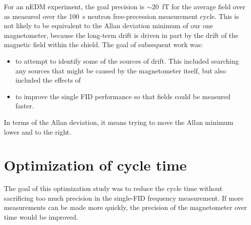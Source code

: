 For an nEDM experiment, the goal precision is $\sim 20$~fT for the
average field over as measured over the 100~s neutron free-precession
measurement cycle.  This is not likely to be equivalent to the Allan
deviation minimum of our one magnetometer, because the long-term drift
is driven in part by the drift of the magnetic field within the
shield.  The goal of subsequent work was:
\begin{itemize}
\item to attempt to identify some of the sources of drift.  This
  included searching any sources that might be caused by the
  magnetometer itself, but also included the effects of
\item to improve the single FID performance so that fields could be
  measured faster.
\end{itemize}
In terms of the Allan deviation, it means trying to move the Allan
minimum lower and to the right.

\section{Optimization of cycle time\label{sec:optimization}} 

The goal of this optimization study was to reduce the cycle time
without sacrificing too much precision in the single-FID frequency
measurement.  If more measurements can be made more quickly, the
precision of the magnetometer over time would be improved.


